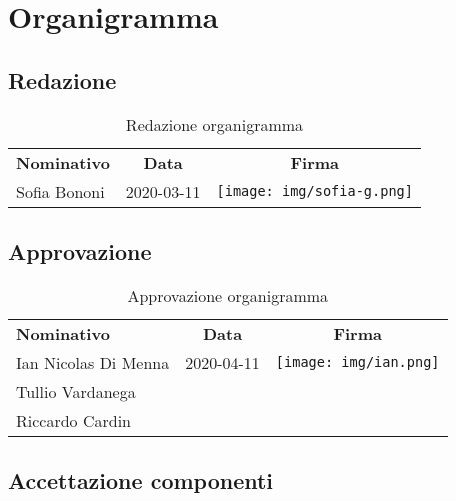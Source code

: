 \documentclass[../piano-di-progetto.tex]{subfiles}
\begin{document}
  \section{Organigramma}

  \subsection{Redazione}
  
  \begin{table}[H]
    \centering
    \begin{tabular}{lcc}
      \rowcolor{lightgray}

      \textbf{Nominativo}  & \textbf{Data} & \textbf{Firma}  \\
    Sofia Bononi & 2020-03-11 & \texttt{[image: img/sofia-g.png]}     \\    
    \end{tabular}
    \caption{Redazione organigramma}
  \end{table}

  \subsection{Approvazione}

  \begin{table}[H]
    \centering
    \begin{tabular}{lcc}
      \rowcolor{lightgray}
      \textbf{Nominativo}  & \textbf{Data} & \textbf{Firma}  \\
      Ian Nicolas Di Menna & 2020-04-11 & \texttt{[image: img/ian.png]}     \\
      Tullio Vardanega & &    \\
      Riccardo Cardin & &
    \end{tabular}
    \caption{Approvazione organigramma}
  \end{table}

  \subsection{Accettazione componenti}
\end{document}
